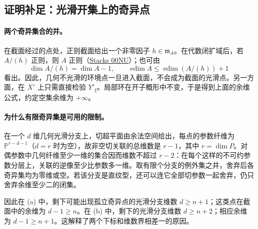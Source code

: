 \endgroup


\hypertarget{D18-108-notes}{}

\begingroup
\def\PP{\mathbb P}\def\OO{\mathcal O}\def\Ocal{\mathcal O}
\def\F{\mathcal F}\def\G{\mathcal G}\def\N{\mathcal N}
\def\PD{\check P}\def\Pdual{\check P}
\def\Ys{Y^{\mathrm{sing}}}\def\Ysing{Y^{\mathrm{sing}}}
\def\Ds{Y^{\mathrm{sup\,sing}}}\def\Ysup{Y^{\mathrm{sup\,sing}}}
\def\cod{\operatorname{codim}}\def\Sing{\operatorname{Sing}}
\def\depth{\operatorname{depth}}\def\coprof{\operatorname{coprof}}
\def\Ass{\operatorname{Ass}}\def\Supp{\operatorname{Supp}}
\def\Gr{\operatorname{Gr}}\def\Spec{\operatorname{Spec}}\def\Proj{\operatorname{Proj}}


\subsection*{证明补足：光滑开集上的奇异点}
\paragraph{两个奇异集合的并。}
在截面经过的点处，正则截面给出一个非零因子 $h\in\mathfrak m_A$。在代数闭扩域后，若 $A/(h)$ 正则，则 $A$ 正则（\href{https://stacks.math.columbia.edu/tag/00NU}{Stacks 00NU}）；也可由
\[
 \dim A/(h)=\dim A-1,\qquad
 \operatorname{edim}A\le \operatorname{edim}(A/(h))+1
\]
看出。因此，几何不光滑的环境点一旦进入截面，不会成为截面的光滑点。另一方面，在 $X'$ 上只需直接检验 $Y'_\xi$。局部环在开子概形中不变，于是得到上面的余维公式，约定空集余维为 $+\infty$。

\paragraph{为什么有限奇异集是可用的限制。}
在一个 $d$ 维几何光滑分支上，切超平面由余法空间给出，每点的参数纤维为 $\mathbb P^{r-d-1}$（$d=r$ 时为空），故非空切关联的总维数是 $r-1$，其中 $r=\dim P$。对偶参数中几何纤维至少一维的集合因而维数不超过 $r-2$：在每个这样的不可约参数分层上，关联的逆像至少比参数多一维。取有限个分支的例外集之并，舍弃后各奇异集均为零维或空。若该分支是直纹型，还可以连它全部切参数一起舍弃，仍只舍弃余维至少二的闭集。

因此在 (a) 中，剩下可能出现孤立奇异点的光滑分支维数 $d\ge n+1$；这类点在截面中的余维为 $d-1\ge n$。在 (b) 中，剩下的光滑分支维数 $d\ge n+2$；相应余维为 $d-1\ge n+1$。这解释了两个下标和维数界相差一的原因。


